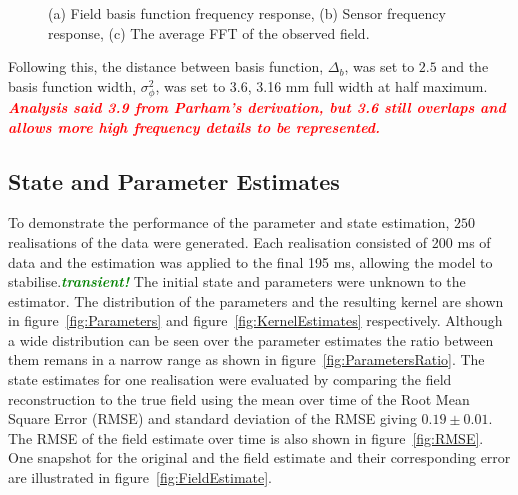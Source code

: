 \documentclass[12pt]{iopart}
\newcommand{\wtf}[1]{\textsf{\emph{\textbf{\textcolor{red}{#1}}}}}
\newcommand{\omg}[1]{\textsf{\emph{\textbf{\textcolor{green}{#1}}}}}
\begin{document}
\begin{figure}
\begin{center}
	\end{center}
	\caption{(a) Field basis function frequency response, (b) Sensor frequency response, (c) The average FFT of the observed field.} 

\end{figure}
Following this, the distance between basis function, $\Delta_b$, was set to $2.5$ and the basis function width, $\sigma_{\phi}^2$, was set to 3.6, 3.16 mm full width at half maximum. \wtf{Analysis said 3.9 from Parham's derivation, but 3.6 still overlaps and allows more high frequency details to be represented.}

\subsection{State and Parameter Estimates} 
\label{sec:state_and_param_results}
To demonstrate the performance of the parameter and state estimation, $250$ realisations of the data were generated. Each realisation consisted of 200 ms of data and the estimation was applied to the final 195 ms, allowing the model to stabilise.\omg{transient!} The initial state and parameters were unknown to the estimator. The distribution of the parameters and the resulting kernel are shown in figure~\ref{fig:Parameters} and figure~\ref{fig:KernelEstimates} respectively. Although a wide distribution can be seen over the parameter estimates the ratio between them remans in a narrow range as shown in figure~\ref{fig:ParametersRatio}. The state estimates for one realisation were evaluated by comparing the field reconstruction to the true field using the mean over time of the Root Mean Square Error (RMSE) and standard deviation of the RMSE giving $0.19\pm 0.01$. The RMSE of the field estimate over time is also shown in figure~\ref{fig:RMSE}. One snapshot for the original and the field estimate and their corresponding error are illustrated in figure~\ref{fig:FieldEstimate}.
\end{document}
